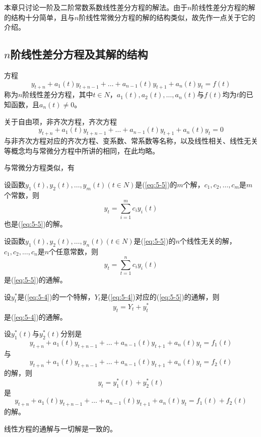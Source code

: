 		本章只讨论一阶及二阶常数系数线性差分方程的解法。由于$n$阶线性差分方程的解的结构十分简单，且与$n$阶线性常微分方程的解的结构类似，故先作一点关于它的介绍。

		\subsection{$n$阶线性差分方程及其解的结构}

		 方程
		\begin{equation}\label{eq:5-4}
			y_{t+n} + a_1(t)y_{t+n-1} + \ldots + a_{n-1}(t)y_{t+1} + a_n(t)y_t = f(t)
		\end{equation}
		称为$n$阶线性{\heiti 差分方程}，其中$t \in N$，$a_1(t), a_2(t), \ldots, a_n(t)$与$f(t)$均为$t$的已知函数，且$a_n(t) \neq 0$。

		关于自由项，非齐次方程，齐次方程
		\begin{equation}\label{eq:5-5}
			y_{t+n} + a_1(t)y_{t+n-1} + \ldots + a_{n-1}(t)y_{t+1} + a_n(t)y_t = 0
		\end{equation}
		与非齐次方程对应的齐次方程、变系数、常系数等名称，以及线性相关、线性无关等概念均与常微分方程中所讲的相同，在此均略。

		与常微分方程类似，有

		\theorem\label{theorem:5-1} 设函数$y_1(t), y_2(t), \ldots, y_m(t) (t \in N)$是(\ref{eq:5-5})的$m$个解，$c_1, c_2, \ldots, c_m$是$m$个常数，则$$y_t = \sum^{m}_{i=1}c_iy_i(t)$$也是(\ref{eq:5-5})的解。

		\theorem\label{theorem:5-2} 设函数$y_1(t), y_2(t), \ldots, y_n(t) (t \in N)$是(\ref{eq:5-5})的$n$个线性无关的解，\\
		$c_1, c_2, \ldots, c_n$是$n$个任意常数，则
		\begin{equation}\label{eq:5-6}
			y_t = \sum ^n _{t=1} c_i y_i (t)
		\end{equation}
		是(\ref{eq:5-5})的通解。

		\theorem\label{theorem:5-3} 设$y^*_t$是(\ref{eq:5-4})的一个特解，$Y_t$是(\ref{eq:5-4})对应的(\ref{eq:5-5})的通解，则$$y_t = Y_t + y^*_t$$是(\ref{eq:5-4})的通解。

		\theorem\label{theorem:5-4} 设$y^*_1(t)$与$y^*_2(t)$分别是$$y_{t+n} + a_1(t)y_{t+n-1} + \ldots + a_{n-1}(t)y_{t+1} + a_n(t)y_t = f_1(t)$$与$$y_{t+n} + a_1(t)y_{t+n-1} + \ldots + a_{n-1}(t)y_{t+1} + a_n(t)y_t = f_2(t)$$的解，则$$y_t = y^*_1(t) + y^*_2(t)$$是$$y_{t+n} + a_1(t)y_{t+n-1} + \ldots + a_{n-1}(t)y_{t+1} + a_n(t)y_t = f_1(t) + f_2(t)$$的解。

		\remark 线性方程的通解与一切解是一致的。


